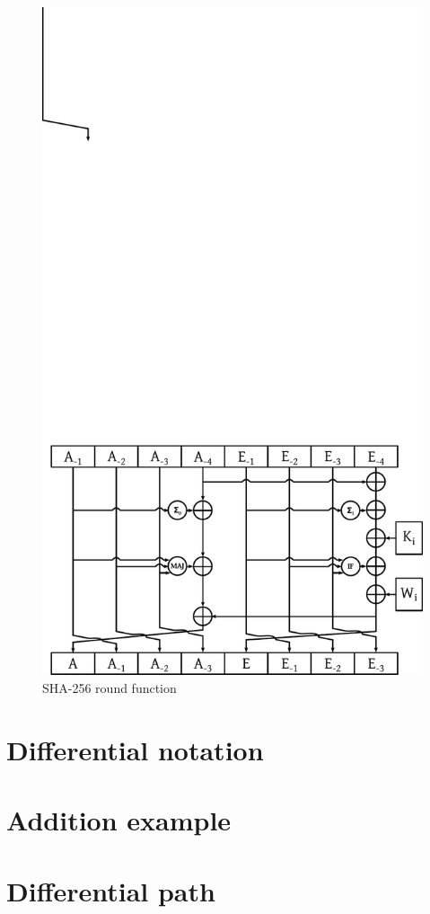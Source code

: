 \begin{figure}[t]
  \begin{center}
    \includegraphics{img/sha256.pdf}
    \caption{SHA-256 round function}
    \label{fig:sha256-round-function}
  \end{center}
\end{figure}

\section{Differential notation}
\section{Addition example}
\section{Differential path}
